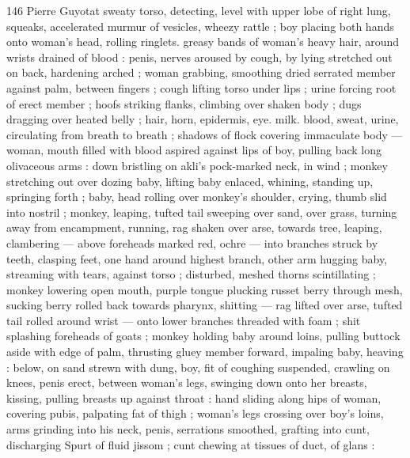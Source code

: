 146 Pierre Guyotat
sweaty torso, detecting, level with upper lobe of right lung, squeaks,
accelerated murmur of vesicles, wheezy rattle ; boy placing both
hands onto woman's head, rolling ringlets. greasy bands of woman's
heavy hair, around wrists drained of blood : penis, nerves aroused by
cough, by lying stretched out on back, hardening arched ; woman
grabbing, smoothing dried serrated member against palm, between
fingers ; cough lifting torso under lips ; urine forcing root of erect
member ; hoofs striking flanks, climbing over shaken body ; dugs
dragging over heated belly ; hair, horn, epidermis, eye. milk. blood,
sweat, urine, circulating from breath to breath ; shadows of flock
covering immaculate body — woman, mouth filled with blood aspired
against lips of boy, pulling back long olivaceous arms : down bristling
on akli’s pock-marked neck, in wind ; monkey stretching out over
dozing baby, lifting baby enlaced, whining, standing up, springing
forth ; baby, head rolling over monkey's shoulder, crying, thumb slid
into nostril ; monkey, leaping, tufted tail sweeping over sand, over
grass, turning away from encampment, running, rag shaken over
arse, towards tree, leaping, clambering — above foreheads marked
red, ochre — into branches struck by teeth, clasping feet, one hand
around highest branch, other arm hugging baby, streaming with
tears, against torso ; disturbed, meshed thorns scintillating ; monkey
lowering open mouth, purple tongue plucking russet berry through
mesh, sucking berry rolled back towards pharynx, shitting — rag
lifted over arse, tufted tail rolled around wrist — onto lower
branches threaded with foam ; shit splashing foreheads of goats ;
monkey holding baby around loins, pulling buttock aside with edge
of palm, thrusting gluey member forward, impaling baby, heaving :
below, on sand strewn with dung, boy, fit of coughing suspended,
crawling on knees, penis erect, between woman's legs, swinging
down onto her breasts, kissing, pulling breasts up against throat :
hand sliding along hips of woman, covering pubis, palpating fat of
thigh ; woman's legs crossing over boy's loins, arms grinding into his
neck, penis, serrations smoothed, grafting into cunt, discharging
Spurt of fluid jissom ; cunt chewing at tissues of duct, of glans :

